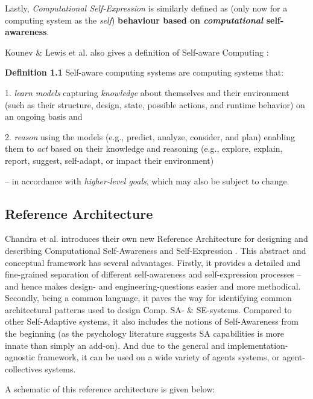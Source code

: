 	Lastly, \textit{Computational Self-Expression} is similarly defined as  (only now for a computing system as the \textit{self}) \textbf{behaviour based on \textit{computational} self-awareness}.
	\newline

	Kounev \& Lewis et al. also gives a definition of Self-aware Computing \cite{sacs17_ch1}:

	\textbf{Definition 1.1} Self-aware computing systems are computing systems that:

	1. \textit{learn models} capturing \textit{knowledge} about themselves and their environment (such as their structure, design, state, possible actions, and runtime behavior) on an ongoing basis and

	2. \textit{reason} using the models (e.g., predict, analyze, consider, and plan) enabling them to \textit{act} based on their knowledge and reasoning (e.g., explore, explain, report, suggest, self-adapt, or impact their environment)

	-- in accordance with \textit{higher-level goals}, which may also be subject to change.


	\subsection{Reference Architecture}

	Chandra et al. introduces their own new Reference Architecture for designing and describing Computational Self-Awareness and Self-Expression \cite{sacs16_ch4}. This abstract and conceptual framework has several advantages. Firstly, it provides a detailed and fine-grained separation of different self-awareness and self-expression processes -- and hence makes design- and engineering-questions easier and more methodical. Secondly, being a common language, it paves the way for identifying common architectural patterns used to design Comp. SA- \& SE-systems. Compared to other Self-Adaptive systems, it also includes the notions of Self-Awareness from the beginning (as the psychology literature suggests SA capabilities is more innate than simply an add-on). And due to the general and implementation-agnostic framework, it can be used on a wide variety of agents systems, or agent-collectives systems.

	A schematic of this reference architecture is given below:

